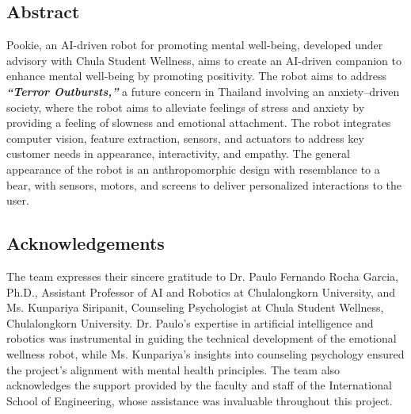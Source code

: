 \documentclass[a4paper,10pt]{article}
\begin{document}
\newpage
\begin{center}
    \item\section*{Abstract}
\end{center}
\large
Pookie, an AI-driven robot for promoting mental well-being, developed under advisory with Chula Student Wellness, aims to create an AI-driven companion to enhance mental well-being by promoting positivity. The robot aims to address \textbf{\textit{“Terror Outbursts,”}} a future concern in Thailand involving an anxiety–driven society, where the robot aims to alleviate feelings of stress and anxiety by providing a feeling of slowness and emotional attachment. The robot integrates computer vision, feature extraction, sensors, and actuators to address key customer needs in appearance, interactivity, and empathy. The general appearance of the robot is an anthropomorphic design with resemblance to a bear, with sensors, motors, and screens to deliver personalized interactions to the user. 
\newpage
\begin{center}
    \item\section*{Acknowledgements}
\end{center}
The team expresses their sincere gratitude to Dr. Paulo Fernando Rocha Garcia, Ph.D., Assistant Professor of AI and Robotics at Chulalongkorn University, and Ms. Kunpariya Siripanit, Counseling Psychologist at Chula Student Wellness, Chulalongkorn University. Dr. Paulo’s expertise in artificial intelligence and robotics was instrumental in guiding the technical development of the emotional wellness robot, while Ms. Kunpariya’s insights into counseling psychology ensured the project’s alignment with mental health principles. The team also acknowledges the support provided by the faculty and staff of the International School of Engineering, whose assistance was invaluable throughout this project. 
\normalsize

\newpage
\tableofcontents

\newpage


\newpage    

\newpage


\newpage
{}


\end{document}
